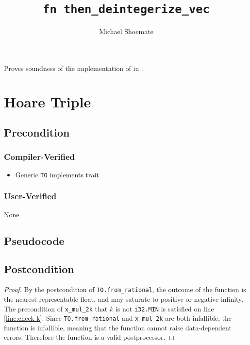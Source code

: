 \documentclass{article}
\title{\texttt{fn then\_deintegerize\_vec}}
\author{Michael Shoemate}
\date{}
\begin{document}
\maketitle

\contrib
Proves soundness of the implementation of  in .

\section{Hoare Triple}
\subsection*{Precondition}
\subsubsection*{Compiler-Verified}

\begin{itemize}
    \item Generic \texttt{TO} implements trait 
\end{itemize}

\subsubsection*{User-Verified}
None

\subsection*{Pseudocode}


\subsection*{Postcondition}
\begin{theorem}
\end{theorem}

\begin{proof}
    By the postcondition of \texttt{TO.from\_rational},
    the outcome of the function is the nearest representable float,
    and may saturate to positive or negative infinity.
    The precondition of \texttt{x\_mul\_2k} that $k$ is not \texttt{i32.MIN} is satisfied on line \ref{line:check-k}.
    Since \texttt{TO.from\_rational} and \texttt{x\_mul\_2k} are both infallible, 
    the function is infallible,
    meaning that the function cannot raise data-dependent errors.
    Therefore the function is a valid postprocessor.
\end{proof}
\end{document}
